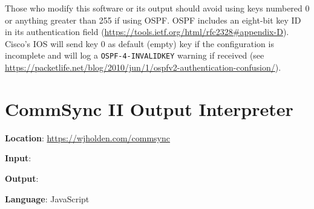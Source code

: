 \documentclass[12pt]{article}
\begin{document}
Those who modify this software or its output should avoid using keys numbered 0 or anything greater than 255 if using OSPF. OSPF includes an eight-bit key ID in its authentication field (\url{https://tools.ietf.org/html/rfc2328#appendix-D}). Cisco's IOS will send key 0 as default (empty) key if the configuration is incomplete and will log a \texttt{OSPF-4-INVALIDKEY} warning if received (see \url{https://packetlife.net/blog/2010/jun/1/ospfv2-authentication-confusion/}).

\section{CommSync II Output Interpreter}

\textbf{Location}: \url{https://wjholden.com/commsync}

\textbf{Input}: 

\textbf{Output}: 

\textbf{Language}: JavaScript
\end{document}
